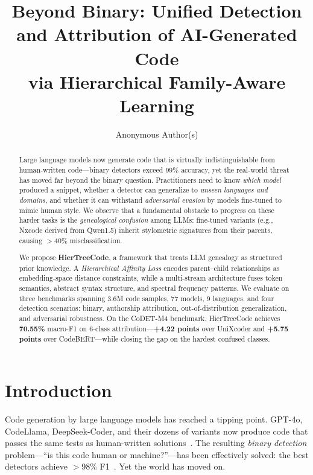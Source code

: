 \documentclass{article}
\title{Beyond Binary: Unified Detection and Attribution of AI-Generated Code\\via Hierarchical Family-Aware Learning}
\author{%
  Anonymous Author(s)
}
\begin{document}
\maketitle

\begin{abstract}
Large language models now generate code that is virtually indistinguishable from human-written code---binary detectors exceed 99\% accuracy, yet the real-world threat has moved far beyond the binary question. Practitioners need to know \emph{which model} produced a snippet, whether a detector can generalize to \emph{unseen languages and domains}, and whether it can withstand \emph{adversarial evasion} by models fine-tuned to mimic human style. We observe that a fundamental obstacle to progress on these harder tasks is the \emph{genealogical confusion} among LLMs: fine-tuned variants (e.g., Nxcode derived from Qwen1.5) inherit stylometric signatures from their parents, causing $>$40\% misclassification.

We propose \textbf{HierTreeCode}, a framework that treats LLM genealogy as structured prior knowledge. A \emph{Hierarchical Affinity Loss} encodes parent--child relationships as embedding-space distance constraints, while a multi-stream architecture fuses token semantics, abstract syntax structure, and spectral frequency patterns. We evaluate on three benchmarks spanning 3.6M code samples, 77 models, 9 languages, and four detection scenarios: binary, authorship attribution, out-of-distribution generalization, and adversarial robustness. On the CoDET-M4 benchmark, HierTreeCode achieves \textbf{70.55\%} macro-F1 on 6-class attribution---\textbf{+4.22 points} over UniXcoder and \textbf{+5.75 points} over CodeBERT---while closing the gap on the hardest confused classes.
\end{abstract}

\section{Introduction}
\label{sec:intro}

Code generation by large language models has reached a tipping point. GPT-4o, CodeLlama, DeepSeek-Coder, and their dozens of variants now produce code that passes the same tests as human-written solutions~\citep{orel2025codet}. The resulting \emph{binary detection} problem---``is this code human or machine?''---has been effectively solved: the best detectors achieve $>$98\% F1~\citep{orel2025codet, aicd2025}. Yet the world has moved on.
\end{document}
